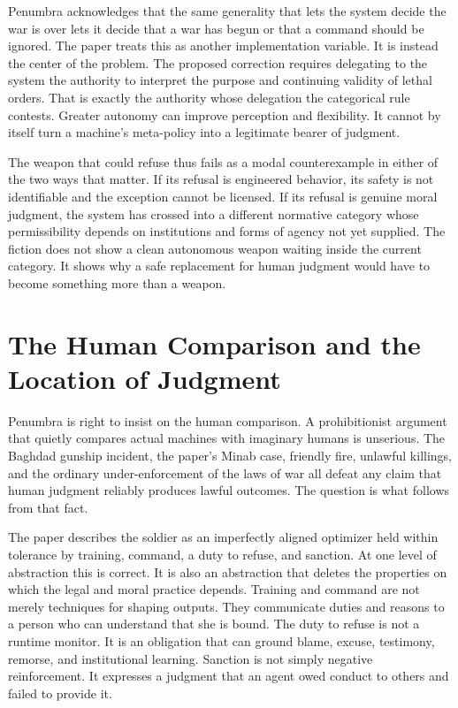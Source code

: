 \documentclass[11pt]{article}
\begin{document}
Penumbra acknowledges that the same generality that lets the system decide the war is over lets it decide that a war has begun or that a command should be ignored. The paper treats this as another implementation variable. It is instead the center of the problem. The proposed correction requires delegating to the system the authority to interpret the purpose and continuing validity of lethal orders. That is exactly the authority whose delegation the categorical rule contests. Greater autonomy can improve perception and flexibility. It cannot by itself turn a machine's meta-policy into a legitimate bearer of judgment.

The weapon that could refuse thus fails as a modal counterexample in either of the two ways that matter. If its refusal is engineered behavior, its safety is not identifiable and the exception cannot be licensed. If its refusal is genuine moral judgment, the system has crossed into a different normative category whose permissibility depends on institutions and forms of agency not yet supplied. The fiction does not show a clean autonomous weapon waiting inside the current category. It shows why a safe replacement for human judgment would have to become something more than a weapon.

\section{The Human Comparison and the Location of Judgment}
\label{sec:human}

Penumbra is right to insist on the human comparison. A prohibitionist argument that quietly compares actual machines with imaginary humans is unserious. The Baghdad gunship incident, the paper's Minab case, friendly fire, unlawful killings, and the ordinary under-enforcement of the laws of war all defeat any claim that human judgment reliably produces lawful outcomes. The question is what follows from that fact.

The paper describes the soldier as an imperfectly aligned optimizer held within tolerance by training, command, a duty to refuse, and sanction. At one level of abstraction this is correct. It is also an abstraction that deletes the properties on which the legal and moral practice depends. Training and command are not merely techniques for shaping outputs. They communicate duties and reasons to a person who can understand that she is bound. The duty to refuse is not a runtime monitor. It is an obligation that can ground blame, excuse, testimony, remorse, and institutional learning. Sanction is not simply negative reinforcement. It expresses a judgment that an agent owed conduct to others and failed to provide it.
\end{document}
